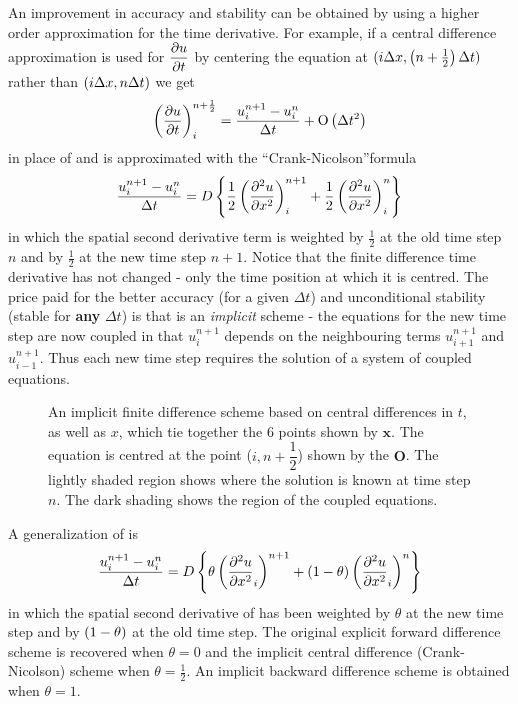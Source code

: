 An improvement in accuracy and stability can be obtained by using a higher
order approximation for the time derivative. For example, if a central
difference approximation is used for $ \dfrac{\partial u}{\partial t} $ by centering the equation
at $(i \Delta x,\left( n+\frac{1}{2} \right) \Delta t)$ rather than $\left( i\Delta
  x,n\Delta t \right)$ we get
\begin{equation}
  \left(  \dfrac{\partial u}{\partial t}  \right)_{i}^{n+\frac{1}{2}} = \dfrac{u_{i}^{n+1}
    -u_{i}^{n}}{\Delta t} +  \mathrm{O}\left( \Delta t^{2} \right) 
  \label{eqn:centering}
\end{equation}
in place of  and  is approximated with the
``Crank-Nicolson''formula
\begin{equation}
  \dfrac{u_{i}^{n+1}-u_{i}^{n}}{\Delta t}=D\left\{ \dfrac{1}{2}\left( 
       \dfrac{\partial^{2} u}{\partial {x}^{2}}  \right)_{i}^{n+1} + \dfrac{1}{2}\left(  \dfrac{\partial^{2} u}{\partial {x}^{2}}  \right)_{i}^{n} \right\}
  \label{eqn:C-N}
\end{equation} 
in which the spatial second derivative term is weighted by $\frac{1}{2}$ at the old
time step $n$ and by $\frac{1}{2}$ at the new time step $n+1$. Notice that the
finite difference time derivative has not changed - only the time position at
which it is centred. The price paid for the better accuracy (for a given
$\Delta t$) and unconditional stability (\ie stable for \textbf{any}
$\Delta t$) is that  is an \emph{implicit} scheme - the
equations for the new time step are now coupled in that $u_{i}^{n+1}$ depends
on the neighbouring terms $u_{i+1}^{n+1}$ and $u_{i-1}^{n+1}$. Thus each new
time step requires the solution of a system of coupled equations.
\begin{figure} \centering
 
 \caption{An implicit finite difference scheme based
   on central differences in $t$, as well as $x$, which tie together the 6
   points shown by $\mathbf{x}$. The equation is centred at the point
   ($i,n+\dfrac{1}{2}$) shown by the $\mathbf{O}$. The lightly shaded region shows
   where the solution is known at time step $n$. The dark shading shows the
   region of the coupled equations.}
 \label{fig:impfd}
\end{figure}

%
%
%
%
%

A generalization of  is
\begin{equation}
  \frac{u_{i}^{n+1}-u_{i}^{n}}{\Delta t} =D\left\{ \theta
    \left(  \dfrac{\partial^{2} u}{\partial {x}^{2}} _{i} \right)^{n+1} + \left( 1-\theta \right)
    \left(  \dfrac{\partial^{2} u}{\partial {x}^{2}} _{i} \right)^{n} \right\}
  \label{eqn:C-N2}
\end{equation}
in which the spatial second derivative of  has been weighted
by $\theta$ at the new time step and by $\left( 1-\theta \right)$ at the old time step. The
original explicit forward difference scheme  is recovered
when $\theta =0$ and the implicit central difference (Crank-Nicolson) scheme
 when $\theta=\frac{1}{2}$. An implicit backward difference
scheme is obtained when $\theta =1$.


